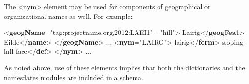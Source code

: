 The \hyperref[TEI.nym]{<nym>} element may be used for components of geographical or organizational names as well. For example: \par\bgroup{}\exampleFont \begin{shaded}\noindent\mbox{}{<\textbf{geogName}\hspace*{1em}{ref}="{tag:projectname.org,2012:LAEI1}"\mbox{}\newline 
\hspace*{1em}{type}="{hill}">}\mbox{}\newline 
{}Lairig{</\textbf{geogFeat}>}\mbox{}\newline 
{}Eilde{</\textbf{name}>}\mbox{}\newline 
{</\textbf{geogName}>} ... {<\textbf{nym}\hspace*{1em}{xml:id}="{LAIRG}">}\mbox{}\newline 
{}lairig{</\textbf{form}>}\mbox{}\newline 
{}sloping hill face{</\textbf{def}>}\mbox{}\newline 
{</\textbf{nym}>} ... \end{shaded}\egroup\par \par
As noted above, use of these elements implies that both the \textsf{dictionaries} and the \textsf{namesdates} modules are included in a schema.
